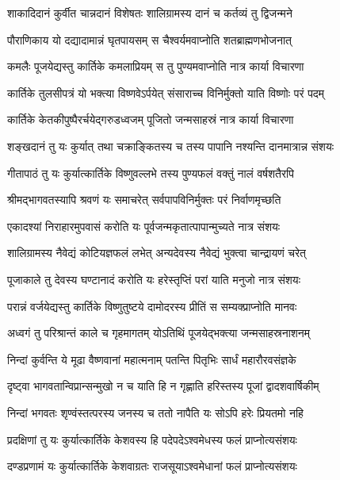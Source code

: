\twolineshloka
{शाकादिदानं कुर्वीत चान्नदानं विशेषतः}
{शालिग्रामस्य दानं च कर्तव्यं तु द्विजन्मने} %

\twolineshloka
{पौराणिकाय यो दद्यादामान्नं घृतपायसम्}
{स चैश्वर्यमवाप्नोति शतब्राह्मणभोजनात्} %

\twolineshloka
{कमलैः पूजयेद्यस्तु कार्तिके कमलाप्रियम्}
{स तु पुण्यमवाप्नोति नात्र कार्या विचारणा} %

\twolineshloka
{कार्तिके तुलसीपत्रं यो भक्त्या विष्णवेऽर्पयेत्}
{संसाराच्च विनिर्मुक्तो याति विष्णोः परं पदम्} %

\twolineshloka
{कार्तिके केतकीपुष्पैरर्चयेद्गरुडध्वजम्}
{पूजितो जन्मसाहस्रं नात्र कार्या विचारणा} %

\twolineshloka
{शङ्खदानं तु यः कुर्यात् तथा चक्राङ्कितस्य च}
{तस्य पापानि नश्यन्ति दानमात्रान्न संशयः} %

\twolineshloka
{गीतापाठं तु यः कुर्यात्कार्तिके विष्णुवल्लभे}
{तस्य पुण्यफलं वक्तुं नालं वर्षशतैरपि} %

\twolineshloka
{श्रीमद्भागवतस्यापि श्रवणं यः समाचरेत्}
{सर्वपापविनिर्मुक्तः परं निर्वाणमृच्छति} %

\twolineshloka
{एकादश्यां निराहारमुपवासं करोति यः}
{पूर्वजन्मकृतात्पापान्मुच्यते नात्र संशयः} %

\twolineshloka
{शालिग्रामस्य नैवेद्यं कोटियज्ञफलं लभेत्}
{अन्यदेवस्य नैवेद्यं भुक्त्वा चान्द्रायणं चरेत्} %

\twolineshloka
{पूजाकाले तु देवस्य घण्टानादं करोति यः}
{हरेस्तृप्तिं परां याति मनुजो नात्र संशयः} %

\twolineshloka
{परान्नं वर्जयेद्यस्तु कार्तिके विष्णुतुष्टये}
{दामोदरस्य प्रीतिं स सम्यक्प्राप्नोति मानवः} %

\twolineshloka
{अध्वगं तु परिश्रान्तं काले च गृहमागतम्}
{योऽतिथिं पूजयेद्भक्त्या जन्मसाहस्रनाशनम्} %

\twolineshloka
{निन्दां कुर्वन्ति ये मूढा वैष्णवानां महात्मनाम्}
{पतन्ति पितृभिः सार्धं महारौरवसंज्ञके} %

\twolineshloka
{दृष्ट्वा भागवतान्विप्रान्सन्मुखो न च याति हि}
{न गृह्णाति हरिस्तस्य पूजां द्वादशवार्षिकीम्} %

\twolineshloka
{निन्दां भगवतः शृण्वंस्तत्परस्य जनस्य च}
{ततो नापैति यः सोऽपि हरेः प्रियतमो नहि} %

\twolineshloka
{प्रदक्षिणां तु यः कुर्यात्कार्तिके केशवस्य हि}
{पदेपदेऽश्वमेधस्य फलं प्राप्नोत्यसंशयः} %

\twolineshloka
{दण्डप्रणामं यः कुर्यात्कार्तिके केशवाग्रतः}
{राजसूयाऽश्वमेधानां फलं प्राप्नोत्यसंशयः} %

